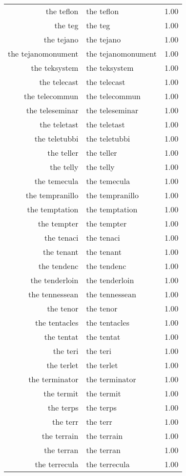 \begin{table}[ht]
\begin{tabular}{rlr}
  the teflon & the teflon & 1.00 \\ 
  the teg & the teg & 1.00 \\ 
  the tejano & the tejano & 1.00 \\ 
  the tejanomonument & the tejanomonument & 1.00 \\ 
  the teksystem & the teksystem & 1.00 \\ 
  the telecast & the telecast & 1.00 \\ 
  the telecommun & the telecommun & 1.00 \\ 
  the teleseminar & the teleseminar & 1.00 \\ 
  the teletast & the teletast & 1.00 \\ 
  the teletubbi & the teletubbi & 1.00 \\ 
  the teller & the teller & 1.00 \\ 
  the telly & the telly & 1.00 \\ 
  the temecula & the temecula & 1.00 \\ 
  the tempranillo & the tempranillo & 1.00 \\ 
  the temptation & the temptation & 1.00 \\ 
  the tempter & the tempter & 1.00 \\ 
  the tenaci & the tenaci & 1.00 \\ 
  the tenant & the tenant & 1.00 \\ 
  the tendenc & the tendenc & 1.00 \\ 
  the tenderloin & the tenderloin & 1.00 \\ 
  the tennessean & the tennessean & 1.00 \\ 
  the tenor & the tenor & 1.00 \\ 
  the tentacles & the tentacles & 1.00 \\ 
  the tentat & the tentat & 1.00 \\ 
  the teri & the teri & 1.00 \\ 
  the terlet & the terlet & 1.00 \\ 
  the terminator & the terminator & 1.00 \\ 
  the termit & the termit & 1.00 \\ 
  the terps & the terps & 1.00 \\ 
  the terr & the terr & 1.00 \\ 
  the terrain & the terrain & 1.00 \\ 
  the terran & the terran & 1.00 \\ 
  the terrecula & the terrecula & 1.00 \\ 

\end{tabular}
\end{table}
